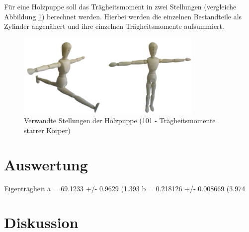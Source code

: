 Für eine Holzpuppe soll das Trägheitsmoment in zwei Stellungen (vergleiche Abbildung \ref{pic_puppe}) berechnet werden. Hierbei werden
die einzelnen Bestandteile als Zylinder angenähert und ihre einzelnen Trägheitsmomente aufsummiert.

\begin{figure}[H]
\includegraphics[width=0.8\textwidth]{pics/puppe.png}
\caption{Verwandte Stellungen der Holzpuppe (101 - Trägheitsmomente starrer Körper)}
\label{pic_puppe}
\end{figure}






\section{Auswertung}

Eigenträgheit
a               = 69.1233          +/- 0.9629       (1.393%
b               = 0.218126         +/- 0.008669     (3.974%



\section{Diskussion}





